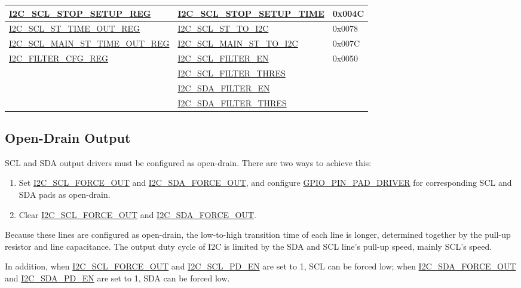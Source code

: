 \documentclass[main\_\_EN.tex]{subfiles}
\begin{document}
\begin{longtable}{ | p{6cm} | p{7cm} | p{2cm} | }
\hyperref[regdesc:I2CSCLSTOPSETUPREG]{I2C\_SCL\_STOP\_SETUP\_REG} & \hyperref[fielddesc:I2CSCLSTOPSETUPTIME]{I2C\_SCL\_STOP\_SETUP\_TIME} & 0x004C  \\ \hline
\hyperref[regdesc:I2CSCLSTTIMEOUTREG]{I2C\_SCL\_ST\_TIME\_OUT\_REG}& \hyperref[fielddesc:I2CSCLSTTOI2C]{I2C\_SCL\_ST\_TO\_I2C} & 0x0078\\ \hline
\hyperref[regdesc:I2CSCLMAINSTTIMEOUTREG]{I2C\_SCL\_MAIN\_ST\_TIME\_OUT\_REG}& \hyperref[fielddesc:I2CSCLMAINSTTOI2C]{I2C\_SCL\_MAIN\_ST\_TO\_I2C} & 0x007C\\ \hline
\hyperref[regdesc:I2CFILTERCFGREG]{I2C\_FILTER\_CFG\_REG} & {\hyperref[fielddesc:I2CSCLFILTEREN]{I2C\_SCL\_FILTER\_EN}} & 0x0050  \\\cline{2-2}
& {\hyperref[fielddesc:I2CSCLFILTERTHRES]{I2C\_SCL\_FILTER\_THRES}}& \\\cline{2-2}
& {\hyperref[fielddesc:I2CSDAFILTEREN]{I2C\_SDA\_FILTER\_EN}} &  \\\cline{2-2}
& {\hyperref[fielddesc:I2CSDAFILTERTHRES]{I2C\_SDA\_FILTER\_THRES}} & \\ \hline
\end{longtable}

\subsection{Open-Drain Output}

SCL and SDA output drivers must be configured as open-drain. There are two ways to achieve this:

\begin{enumerate}
\item Set \hyperref[fielddesc:I2CSCLFORCEOUT]{I2C\_SCL\_FORCE\_OUT} and \hyperref[fielddesc:I2CSDAFORCEOUT]{I2C\_SDA\_FORCE\_OUT}, and configure \hyperref[fielddesc:GPIOPINNPADDRIVER]{GPIO\_PIN\_PAD\_DRIVER} for corresponding SCL and SDA pads as open-drain.
\item Clear \hyperref[fielddesc:I2CSCLFORCEOUT]{I2C\_SCL\_FORCE\_OUT} and \hyperref[fielddesc:I2CSDAFORCEOUT]{I2C\_SDA\_FORCE\_OUT}.
\end{enumerate}

Because these lines are configured as open-drain, the low-to-high transition time of each line is longer, determined together by the pull-up resistor and line capacitance. The output duty cycle of I2C is limited by the SDA and SCL line's pull-up speed, mainly SCL's speed.

In addition, when \hyperref[fielddesc:I2CSCLFORCEOUT]{I2C\_SCL\_FORCE\_OUT} and \hyperref[fielddesc:I2CSCLPDEN]{I2C\_SCL\_PD\_EN} are set to 1, SCL can be forced low; when \hyperref[fielddesc:I2CSDAFORCEOUT]{I2C\_SDA\_FORCE\_OUT} and \hyperref[fielddesc:I2CSDAPDEN]{I2C\_SDA\_PD\_EN} are set to 1, SDA can be forced low.
\end{document}

